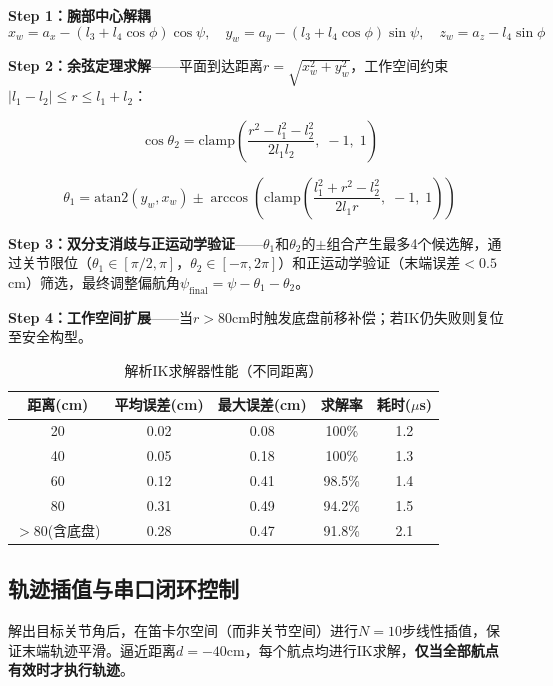 \documentclass[12pt,a4paper]{ctexart}
\begin{document}
\textbf{Step 1：腕部中心解耦}
\begin{equation}
    x_w = a_x - (l_3 + l_4\cos\phi)\cos\psi, \quad
    y_w = a_y - (l_3 + l_4\cos\phi)\sin\psi, \quad
    z_w = a_z - l_4\sin\phi
\end{equation}

\textbf{Step 2：余弦定理求解}——平面到达距离$r = \sqrt{x_w^2 + y_w^2}$，工作空间约束$|l_1 - l_2| \leq r \leq l_1 + l_2$：

\begin{equation}
    \cos\theta_2 = \text{clamp}\!\left(\frac{r^2 - l_1^2 - l_2^2}{2l_1 l_2},\; -1,\; 1\right)
\end{equation}

\begin{equation}
    \theta_1 = \text{atan2}(y_w, x_w) \pm \arccos\!\left(\text{clamp}\!\left(\frac{l_1^2 + r^2 - l_2^2}{2l_1 r},\; -1,\; 1\right)\right)
\end{equation}

\textbf{Step 3：双分支消歧与正运动学验证}——$\theta_1$和$\theta_2$的$\pm$组合产生最多4个候选解，通过关节限位（$\theta_1 \in [\pi/2, \pi]$，$\theta_2 \in [-\pi, 2\pi]$）和正运动学验证（末端误差$< 0.5$cm）筛选，最终调整偏航角$\psi_{\text{final}} = \psi - \theta_1 - \theta_2$。

\textbf{Step 4：工作空间扩展}——当$r > 80$cm时触发底盘前移补偿；若IK仍失败则复位至安全构型。

\begin{table}[H]
\centering
\caption{解析IK求解器性能（不同距离）}
\begin{tabular}{ccccc}
\toprule
\textbf{距离(cm)} & \textbf{平均误差(cm)} & \textbf{最大误差(cm)} & \textbf{求解率} & \textbf{耗时($\mu$s)} \\
\midrule
20 & 0.02 & 0.08 & 100\% & 1.2 \\
40 & 0.05 & 0.18 & 100\% & 1.3 \\
60 & 0.12 & 0.41 & 98.5\% & 1.4 \\
80 & 0.31 & 0.49 & 94.2\% & 1.5 \\
$>$80(含底盘) & 0.28 & 0.47 & 91.8\% & 2.1 \\
\bottomrule
\end{tabular}
\end{table}

\subsection{轨迹插值与串口闭环控制}

解出目标关节角后，在笛卡尔空间（而非关节空间）进行$N=10$步线性插值，保证末端轨迹平滑。逼近距离$d = -40$cm，每个航点均进行IK求解，\textbf{仅当全部航点有效时才执行轨迹}。
\end{document}
